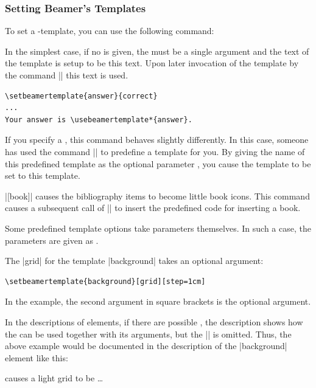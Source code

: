 \subsubsection{Setting Beamer's Templates}

To set  a \beamer-template, you can use the following command:

\begin{command}{\setbeamertemplate{}}
  In the simplest case, if no  is given, the  must be a single argument and the text of the template  is setup to be this text. Upon later invocation of the template by the command |\usebeamertemplate| this text is used.

  \example
\begin{verbatim}
\setbeamertemplate{answer}{correct}
...
Your answer is \usebeamertemplate*{answer}.
\end{verbatim}

  If you specify a , this command behaves slightly differently. In this case, someone has used the command || to predefine a template for you. By giving the name of this predefined template as the optional parameter , you cause the template  to be set to this template.

  \example
  |[book]| causes the bibliography items to become little book icons. This command causes a subsequent call of || to insert the predefined code for inserting a book.

  Some predefined template options take parameters themselves. In such a case, the parameters are given as .

  \example
  The  |grid| for the template |background| takes an optional argument:
\begin{verbatim}
\setbeamertemplate{background}[grid][step=1cm]
\end{verbatim}

  In the example, the second argument in square brackets is the optional argument.

  In the descriptions of elements, if there are possible , the description shows how the  can be used together with its arguments, but the || is omitted. Thus, the above example would be documented in the description of the |background| element like this:
  \begin{itemize}
     causes a light grid to be \dots
  \end{itemize}
\end{command}

